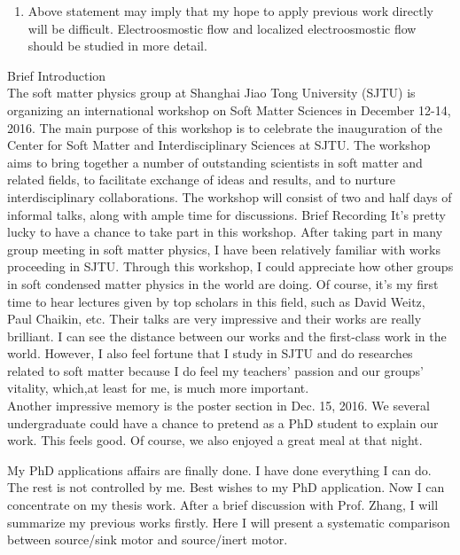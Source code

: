 \documentclass[fontsize=11pt, %
                             paper=a4, %
                             twoside, %
                             captions=tableheading,
                             index=totoc,
                             hyperref]{labbook}
\begin{document}
\begin{addmargin}[4cm]{0cm}
\begin{enumerate}
\item
Above statement may imply that my hope to apply previous work directly will be difficult. Electroosmostic flow and localized electroosmostic flow should be studied in more detail.
\end{enumerate}
\large{Brief Introduction}\\
The soft matter physics group at Shanghai Jiao Tong University (SJTU) is organizing an international workshop on Soft Matter Sciences in December 12-14, 2016. The main purpose of this workshop is to celebrate the inauguration of the Center for Soft Matter and Interdisciplinary Sciences at SJTU. The workshop aims to bring together a number of outstanding scientists in soft matter and related fields, to facilitate exchange of ideas and results, and to nurture interdisciplinary collaborations. The workshop will consist of two and half days of informal talks, along with ample time for discussions.
\large{Brief Recording}
It's pretty lucky to have a chance to take part in this workshop. After taking part in many group meeting in soft matter physics, I have been relatively familiar with works proceeding in SJTU. Through this workshop, I could appreciate how other groups in soft condensed matter physics in the world are doing. Of course, it's my first time to hear lectures given by top scholars in this field, such as David Weitz, Paul Chaikin, etc. Their talks are very impressive and their works are really brilliant. I can see the distance between our works and the first-class work in the world. However, I also feel fortune that I study in SJTU and do researches related to soft matter because I do feel my teachers' passion and our groups' vitality, which,at least for me, is much more important.\\
Another impressive memory is the poster section in Dec. 15, 2016. We several undergraduate could have a chance to pretend as a PhD student to explain our work. This feels good. Of course, we also enjoyed a great meal at that night.
\end{addmargin}
My PhD applications affairs are finally done. I have done everything I can do. The rest is not controlled by me. Best wishes to my PhD application. Now I can concentrate on my thesis work. After a brief discussion with Prof. Zhang, I will summarize my previous works firstly. Here I will present a systematic comparison between source/sink motor and source/inert motor.\\
\end{document}
